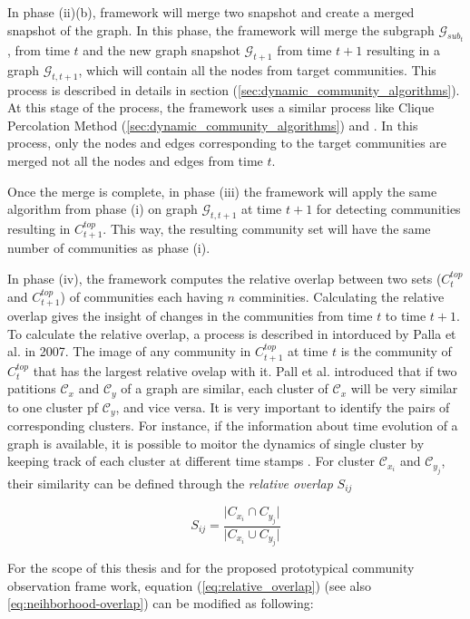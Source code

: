 In phase (ii)(b), framework will merge two snapshot and create a merged snapshot of the graph. In this phase, the framework will merge the subgraph $\mathcal{G}_{sub_{t}}$, from time $t$ and the new graph snapshot $\mathcal{G}_{t+1}$ from time $t+1$ resulting in a graph $\mathcal{G}_{t, t+1}$, which will contain all the nodes from target communities. This process is described in details in section (\ref{sec:dynamic_community_algorithms}). At this stage of the process, the framework uses a similar process like Clique Percolation Method (\ref{sec:dynamic_community_algorithms}) and \cite{ref-23}. In this process, only the nodes and edges corresponding to the target communities are merged not all the nodes and edges from time $t$.

Once the merge is complete, in phase (iii) the framework will apply the same algorithm from phase (i) on graph $\mathcal{G}_{t, t+1}$ at  time $t+1$ for detecting communities resulting in $C_{t+1}^{top}$. This way, the resulting community set will have the same number of communities as phase (i).

In phase (iv), the framework computes the relative overlap between two sets ($C_t^{top}$ and $C_{t+1}^{top}$) of communities each having $n$ comminities. Calculating the relative overlap gives the insight of changes in the communities from time $t$ to time $t+1$. To calculate the relative overlap, a process is described in \cite{ref-23} intorduced by Palla et al. in 2007. The image of any community in $C_{t+1}^{top}$ at time $t$ is the community of $C_t^{top}$ that has the largest relative ovelap with it. Pall et al. introduced that if two patitions $\mathcal{C}_x$ and $\mathcal{C}_y$ of a graph are similar, each cluster of $\mathcal{C}_x$ will be very similar to one cluster pf $\mathcal{C}_y$, and vice versa. It is very important to identify the pairs of corresponding clusters. For instance, if the information about time evolution of a graph is available, it is possible to moitor the dynamics of single cluster by keeping track of each cluster at different time stamps \cite{ref-23}. For cluster $\mathcal{C}_{x_{i}}$ and $\mathcal{C}_{y_{j}}$, their similarity can be defined through the \textit{relative overlap} $S_{ij}$

\begin{equation}\label{eq:relative_overlap}
S_{ij} = \dfrac{\lvert C_{x_{i}} \cap C_{y_{j}} \rvert}{\lvert C_{x_{i}} \cup C_{y_{j}} \rvert}
\end{equation} 

For the scope of this thesis and for the proposed prototypical community observation frame work, equation (\ref{eq:relative_overlap}) (see also \ref{eq:neihborhood-overlap}) can be modified as following:

